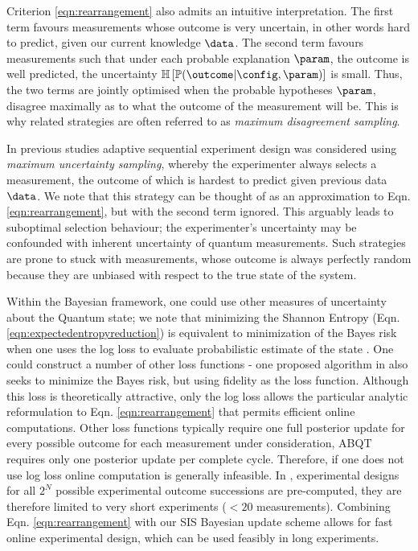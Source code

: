 Criterion \eqref{eqn:rearrangement}  also admits an intuitive interpretation. The first term favours measurements whose outcome is very uncertain, in other words hard to predict, given our current knowledge $\data$. The second term favours measurements such that under each probable explanation $\param$, the outcome is well predicted, the uncertainty $\mathbb{H}\left[ \mathbb{P}(\outcome|\config,\param) \right]$ is small. Thus, the two terms are jointly optimised when the probable hypotheses $\param$, disagree maximally as to what the outcome of the measurement will be. This is why related strategies are often referred to as \emph{maximum disagreement sampling}.

In previous studies \cite{SelfLearning} adaptive sequential experiment design was considered using \emph{maximum uncertainty sampling}, whereby the experimenter always selects a measurement, the outcome of which is hardest to predict given previous data $\data$. We note that this strategy can be thought of as an approximation to Eqn. \eqref{eqn:rearrangement}, but with the second term ignored. This arguably leads to suboptimal selection behaviour; the experimenter's uncertainty may be confounded with inherent uncertainty of quantum measurements. Such strategies are prone to stuck with measurements, whose outcome is always perfectly random because they are unbiased with respect to the true state of the system.

Within the Bayesian framework, one could use other measures of uncertainty about the Quantum state; we note that minimizing the Shannon Entropy (Eqn. \eqref{eqn:expectedentropyreduction}) is equivalent to minimization of the Bayes risk when one uses the log loss to evaluate probabilistic estimate of the state \cite{Dawid2007}. One could construct a number of other loss functions - one proposed algorithm in \cite{SelfLearning} also seeks to minimize the Bayes risk, but using fidelity as the loss function. Although this loss is theoretically attractive, only the log loss allows the particular analytic reformulation to Eqn. \eqref{eqn:rearrangement} that permits efficient online computations. Other loss functions typically require one full posterior update for every possible outcome for each measurement under consideration, ABQT requires only one posterior update per complete cycle. Therefore, if one does not use log loss online computation is generally infeasible. In \cite{SelfLearningExperimental}, experimental designs for all $2^N$ possible experimental outcome successions are pre-computed, they are therefore limited to very short experiments ($< 20$ measurements). Combining Eqn. \eqref{eqn:rearrangement} with our SIS Bayesian update scheme allows for fast online experimental design, which can be used feasibly in long experiments.

